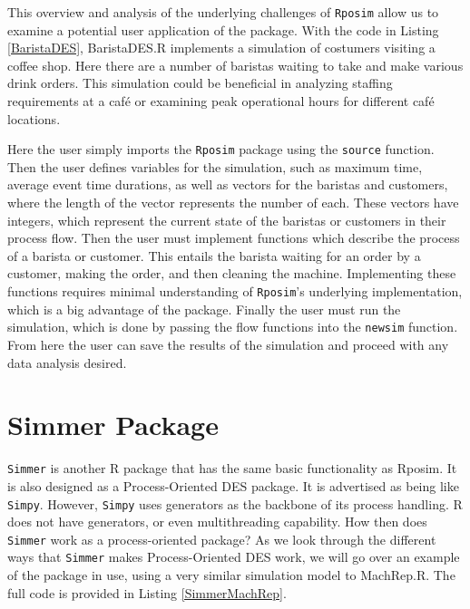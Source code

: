 \documentclass[a4paper, 11pt]{article} %
\begin{document}


This overview and analysis of the underlying challenges of \texttt{Rposim} allow us to examine a potential user application of the package. With the code in Listing \ref{BaristaDES}, BaristaDES.R implements a simulation of costumers visiting a coffee shop. Here there are a number of baristas waiting to take and make various drink orders. This simulation could be beneficial in analyzing staffing requirements at a café or examining peak operational hours for different café locations.

Here the user simply imports the \texttt{Rposim} package using the \texttt{source} function. Then the user defines variables for the simulation, such as maximum time, average event time durations, as well as vectors for the baristas and customers, where the length of the vector represents the number of each. These vectors have integers, which represent the current state of the baristas or customers in their process flow. Then the user must implement functions which describe the process of a barista or customer. This entails the barista waiting for an order by a customer, making the order, and then cleaning the machine. Implementing these functions requires minimal understanding of \texttt{Rposim}'s underlying implementation, which is a big advantage of the package. Finally the user must run the simulation, which is done by passing the flow functions into the \texttt{newsim} function. From here the user can save the results of the simulation and proceed with any data analysis desired. \newline


\pagebreak


\section{Simmer Package}


\texttt{Simmer} is another R package that has the same basic functionality as Rposim. It is also designed as a Process-Oriented DES package. It is advertised as being like \texttt{Simpy}. However, \texttt{Simpy} uses generators as the backbone of its process handling. R does not have generators, or even multithreading capability. How then does \texttt{Simmer} work as a process-oriented package? As we look through the different ways that \texttt{Simmer} makes Process-Oriented DES work, we will go over an example of the package in use, using a very similar simulation model to MachRep.R. The full code is provided in Listing \ref{SimmerMachRep}. \newline
\end{document}
